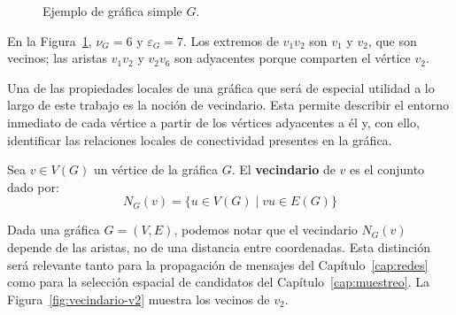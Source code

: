 \begin{figure}[H]
    \centering
    \caption{Ejemplo de gráfica simple $G$.}
    \label{fig:G}
\end{figure}

En la Figura~\ref{fig:G}, $\nu_G=6$ y $\varepsilon_G=7$. Los extremos de $v_1v_2$ son $v_1$ y $v_2$, que son vecinos; las aristas $v_1v_2$ y $v_2v_6$ son adyacentes porque comparten el vértice $v_2$.

Una de las propiedades locales de una gráfica que será de especial utilidad a lo largo de este trabajo es la noción de vecindario. Esta permite describir el entorno inmediato de cada vértice a partir de los vértices adyacentes a él y, con ello, identificar las relaciones locales de conectividad presentes en la gráfica.

\begin{definition}[Vecindario]
\label{def:vecindario}
    Sea $v\in V(G)$ un vértice de la gráfica $G$. El \textbf{vecindario} de $v$ es el conjunto dado por:
    \[
        N_G(v) = \{u \in V(G) \mid vu \in E(G)\}
    \]
\end{definition}

Dada una gráfica $G= (V,E)$, podemos notar que el vecindario $N_G(v)$ depende de las aristas, no de una distancia entre coordenadas. Esta distinción será relevante tanto para la propagación de mensajes del Capítulo~\ref{cap:redes} como para la selección espacial de candidatos del Capítulo~\ref{cap:muestreo}. La Figura~\ref{fig:vecindario-v2} muestra los vecinos de $v_2$.


